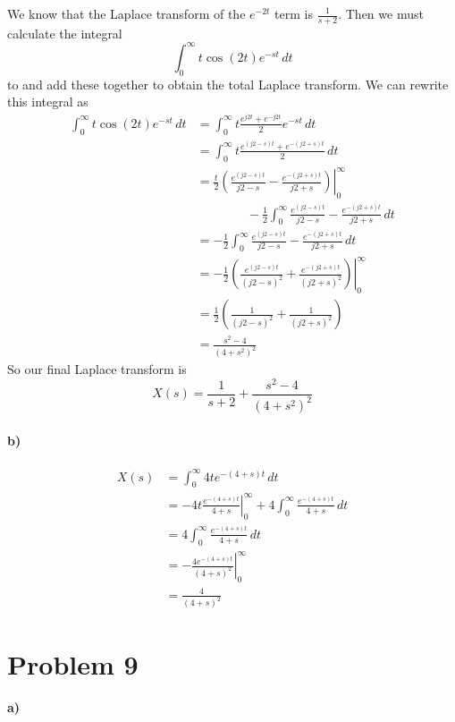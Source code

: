 \documentclass[12pt]{article}
\begin{document}
We know that the Laplace transform of the \(e^{-2t}\) term is \(\frac{1}{s+2}\). Then we must calculate the integral
\[\int_0^\infty t \cos(2t) e^{-st}\,dt\]
to and add these together to obtain the total Laplace transform. We can rewrite this integral as
\begin{align*}
    \int_0^\infty t \cos(2t) e^{-st}\,dt &= \int_0^\infty t \frac{e^{j2t}+e^{-j2t}}{2} e^{-st}\,dt\\
    &=\int_0^\infty t \frac{e^{(j2-s)t}+e^{-(j2+s)t}}{2}\,dt\\
    &=\left.\frac{t}{2}\left(\frac{e^{(j2-s)t}}{j2-s}-\frac{e^{-(j2+s)t}}{j2+s}\right)\right|_0^\infty\\
    &\qquad\qquad- \frac{1}{2}\int_0^\infty \frac{e^{(j2-s)t}}{j2-s}-\frac{e^{-(j2+s)t}}{j2+s}\,dt\\
    &=-\frac{1}{2}\int_0^\infty \frac{e^{(j2-s)t}}{j2-s}-\frac{e^{-(j2+s)t}}{j2+s}\,dt\\
    &=-\frac{1}{2}\left.\left(\frac{e^{(j2-s)t}}{(j2-s)^2}+\frac{e^{-(j2+s)t}}{(j2+s)^2}\right)\right|_0^\infty\\
    &=\frac{1}{2}\left(\frac{1}{(j2-s)^2}+\frac{1}{(j2+s)^2}\right)\\
    &=\frac{s^2-4}{(4+s^2)^2}
\end{align*}
So our final Laplace transform is
\[X(s)=\frac{1}{s+2} + \frac{s^2-4}{(4+s^2)^2}\]

\paragraph{b)}

\begin{align*}
    X(s) &= \int_0^\infty 4te^{-(4+s)t}\,dt\\
    &=\left.-4t\frac{e^{-(4+s)t}}{4+s}\right|_0^\infty + 4\int_0^\infty \frac{e^{-(4+s)t}}{4+s}\,dt\\
    &=4\int_0^\infty \frac{e^{-(4+s)t}}{4+s}\,dt\\
    &=\left.-\frac{4e^{-(4+s)t}}{(4+s)^2}\right|_0^\infty\\
    &=\frac{4}{(4+s)^2}
\end{align*}

\section*{Problem 9}

\paragraph{a)}
\end{document}
